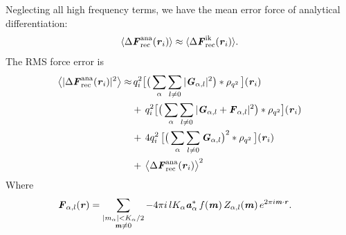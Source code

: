 \documentclass[aps,pre,preprint]{revtex4}
\renewcommand{\v}[1]{\textbf{\textit{#1}}}
\begin{document}
Neglecting all high frequency terms, we have the mean error force of
analytical differentiation:
\begin{align}\label{eqn:ana.meanf}
  \langle \Delta\v F_{\textrm{rec}}^{\textrm{ana}}(\v r_i)\rangle
  \approx
  \langle \Delta\v F_{\textrm{rec}}^{\textrm{ik}}(\v r_i)\rangle.
\end{align}
The RMS force error is 
\begin{align}\nonumber
  \big\langle
  \vert \Delta\v F_{\textrm{rec}}^{\textrm{ana}}(\v r_i)\vert^2
  \big\rangle
  \approx&\,
  q_i^2
  \big[
  \big(
  \sum_{\alpha} \sum_{l\neq 0}
  \vert \v G_{\alpha,l}\vert^2
  \big)
  \ast \rho_{q^2}
  \,\big] (\v r_i) \\\nonumber
  & +\,
  q_i^2
  \big[
  \big(
  \sum_{\alpha}\sum_{l\neq 0}
  \vert
  \v G_{\alpha,l} + \v F_{\alpha,l}\vert^2
  \big)
  \ast \rho_{q^2}
  \big]
  (\v r_i) \\ \nonumber
  & +\,
  4q_i^2\,
  \big[
  \big(
  \sum_{\alpha} \sum_{l\neq 0}  
  \v G_{\alpha,l}
  \big)^2
  \ast \rho_{q^2}\,
  \big] (\v r_i) \\\label{eqn:ana.error}
  & +\,
  \big\langle \Delta\v F_{\textrm{rec}}^{\textrm{ana}}(\v r_i)\big\rangle ^2
\end{align}
Where
\begin{align}
  \v F_{\alpha,l} (\v r)
  &=
  \sum_{
    \begin{subarray}{c}
      \vert m_{\alpha}\vert < K_\alpha/2\\
      \v m\neq 0
    \end{subarray}}
  -4 \pi i\, l K_\alpha \v a^\ast_\alpha\,f(\v m)\,
  Z_{\alpha,l}(\v m)\,
  e^{2\pi i\v m\cdot \v r}.
\end{align}
\end{document}

